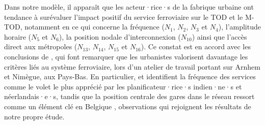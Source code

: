 \begin{refsegment}
Dans notre modèle, il apparaît que les acteur·rice·s de la fabrique urbaine ont tendance à surévaluer l'impact positif du service ferroviaire sur le \acrshort{TOD} et le \acrshort{M-TOD}, notamment en ce qui concerne la fréquence (\(N_{1}\), \(N_{2}\), \(N_{3}\) et \(N_{4}\)), l'amplitude horaire (\(N_{5}\) et \(N_{6}\)), la position nodale d'interconnexion (\(N_{10}\)) ainsi que l'accès direct aux métropoles (\(N_{13}\), \(N_{14}\), \(N_{15}\) et \(N_{16}\)). Ce constat est en accord avec les conclusions de \textcolor{blue}{\textcite[41]{lukman_development_2014}}, qui font remarquer que les urbanistes valorisent davantage les critères liés au système ferroviaire, lors d'un atelier de travail portant sur Arnhem et Nimègue, aux Pays-Bas. En particulier, \textcolor{blue}{\textcite[2~430]{kumar_developing_2020}} et \textcolor{blue}{\textcite[42]{lukman_development_2014}} identifient la fréquence des services comme le volet le plus apprécié par les planificateur·rice·s indien·ne·s et néerlandais·e·s, tandis que la position centrale des gares dans le réseau ressort comme un élément clé en Belgique \textcolor{blue}{\autocite[95]{caset_planning_2019}}, observations qui rejoignent les résultats de notre propre étude.


\end{refsegment}
